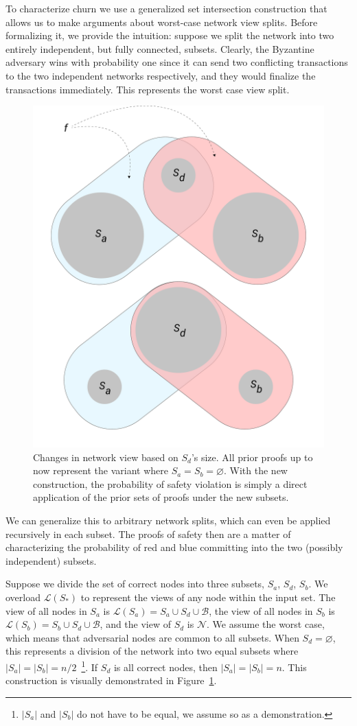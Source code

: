 \documentclass[letterpaper,twocolumn,10pt]{article}
\let\emptyset\varnothing
\theoremstyle{definition}
\begin{document}
\begin{appendices}
{To characterize churn we use a generalized set intersection construction that allows us to make arguments about worst-case network view splits. Before formalizing it, we provide the intuition: suppose we split the network into two entirely independent, but fully connected, subsets. Clearly, the Byzantine adversary wins with probability one since it can send two conflicting transactions to the two independent networks respectively, and they would finalize the transactions immediately. This represents the worst case view split. 
\begin{figure}
\centering
\includegraphics[width=0.8\linewidth]{figures/network_view.pdf}
\caption{Changes in network view based on $S_d$'s size. All prior proofs up to now represent the variant where $S_a = S_b = \emptyset$. With the new construction, the probability of safety violation is simply a direct application of the prior sets of proofs under the new subsets.}
\label{fig:network_view}
\end{figure}
We can generalize this to arbitrary network splits, which can even be applied recursively in each subset. The proofs of safety then are a matter of characterizing the probability of red and blue committing into the two (possibly independent) subsets.

Suppose we divide the set of correct nodes into three subsets, $S_a$, $S_d$, $S_b$. We overload $\mathcal{L}(S_{*})$ to represent the views of any node within the input set. The view of all nodes in $S_a$ is $\mathcal{L}(S_a) = S_a \cup S_d \cup \mathcal{B}$, the view of all nodes in $S_b$ is $\mathcal{L}(S_b) = S_b \cup S_d \cup \mathcal{B}$, and the view of $S_d$ is $\mathcal{N}$. We assume the worst case, which means that adversarial nodes are common to all subsets. When $S_d = \emptyset$, this represents a division of the network into two equal subsets where $|S_a| = |S_b| = n/2$~\footnote{$|S_a|$ and $|S_b|$ do not have to be equal, we assume so as a demonstration.}. If $S_d$ is all correct nodes, then $|S_a| = |S_b| = n$. This construction is visually demonstrated in Figure~\ref{fig:network_view}. 

}
\end{appendices}
\end{document}
